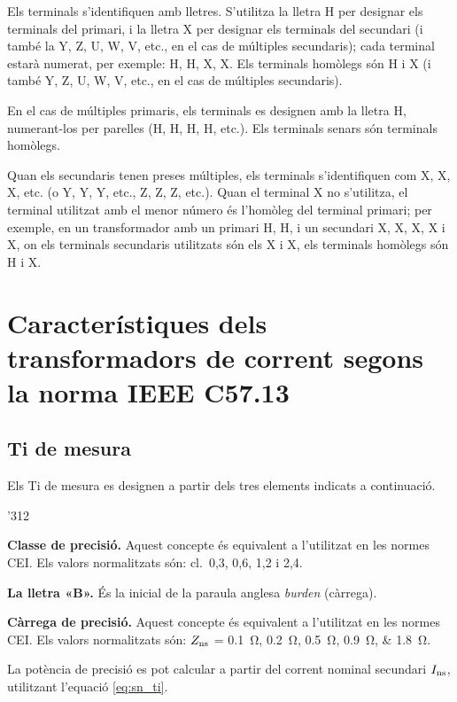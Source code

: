 Els terminals s'identifiquen amb lletres. S'utilitza la lletra H per designar els terminals del primari, i la lletra X per designar els terminals del secundari (i també la Y, Z, U, W, V,  etc.{}, en el cas de múltiples secundaris); cada terminal estarà numerat, per exemple: H, H,  X, X. Els terminals homòlegs són H i X (i també Y, Z, U, W, V, etc.{}, en el cas de múltiples secundaris).

En el cas de múltiples primaris, els terminals es designen amb la lletra H, numerant-los per parelles (H, H, H, H, etc.{}). Els terminals senars són terminals homòlegs.

Quan els secundaris tenen preses múltiples, els terminals s'identifiquen com X, X, X, etc.{} (o Y, Y, Y, etc.{}, Z, Z, Z, etc.{}). Quan el terminal X no s'utilitza, el terminal utilitzat amb el menor número és l'homòleg del terminal primari; per exemple, en un transformador amb un primari H, H, i un secundari  X, X, X, X i X, on els terminals secundaris utilitzats són els X i  X, els terminals homòlegs són H i X.


\section{Característiques dels transformadors de corrent segons la norma IEEE C57.13}


\subsection{Ti de mesura}

Els Ti de mesura  es designen a partir
dels tres elements indicats a continuació.

\begin{dingautolist}{'312}
    \item \textbf{Classe de precisió.} Aquest concepte és equivalent
    a l'utilitzat en les normes CEI. Els valors
    normalitzats són: cl.~0,3, 0,6, 1,2 i 2,4.
    \item \textbf{La lletra «B».} És la inicial de la paraula anglesa
    \textit{burden}  (càrrega).
    \item \textbf{Càrrega de precisió.} Aquest concepte és equivalent
    a l'utilitzat en les normes CEI. Els valors
    normalitzats són: $Z_\mathrm{ns}$ = \qtylist{0,1;0,2;0,5;0,9;1,8}{\ohm}.

    La potència de precisió es pot calcular a partir del
    corrent  nominal secundari $I_\mathrm{ns}$, utilitzant l'equació
    \eqref{eq:sn_ti}.
\end{dingautolist}

